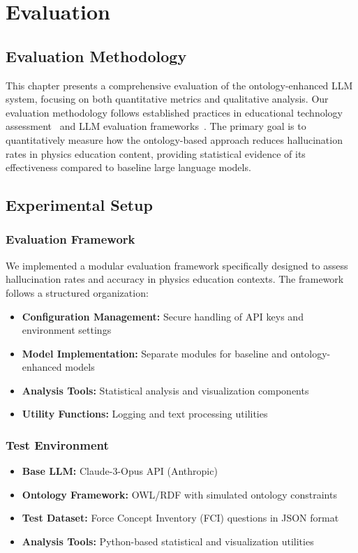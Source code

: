 \chapter{Evaluation}
\label{chap:evaluation}

\section{Evaluation Methodology}
\label{sec:eval-methodology}

This chapter presents a comprehensive evaluation of the ontology-enhanced LLM system, focusing on both quantitative metrics and qualitative analysis. Our evaluation methodology follows established practices in educational technology assessment~\cite{wilson2024educational} and LLM evaluation frameworks~\cite{huang2024survey,chen2024comparing}. The primary goal is to quantitatively measure how the ontology-based approach reduces hallucination rates in physics education content, providing statistical evidence of its effectiveness compared to baseline large language models.

\section{Experimental Setup}
\label{sec:experimental-setup}

\subsection{Evaluation Framework}
We implemented a modular evaluation framework specifically designed to assess hallucination rates and accuracy in physics education contexts. The framework follows a structured organization:

\begin{itemize}
    \item \textbf{Configuration Management:} Secure handling of API keys and environment settings
    \item \textbf{Model Implementation:} Separate modules for baseline and ontology-enhanced models
    \item \textbf{Analysis Tools:} Statistical analysis and visualization components
    \item \textbf{Utility Functions:} Logging and text processing utilities
\end{itemize}

\subsection{Test Environment}
\begin{itemize}
    \item \textbf{Base LLM:} Claude-3-Opus API (Anthropic)
    \item \textbf{Ontology Framework:} OWL/RDF with simulated ontology constraints
    \item \textbf{Test Dataset:} Force Concept Inventory (FCI) questions in JSON format
    \item \textbf{Analysis Tools:} Python-based statistical and visualization utilities
\end{itemize}

